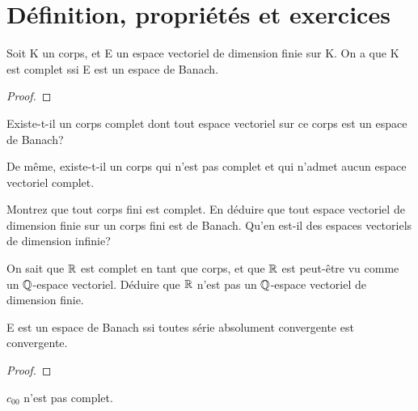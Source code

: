 \section{Définition, propriétés et exercices}


\begin{proposition}
	Soit K un corps, et E un espace vectoriel de dimension finie sur K. On a que
	K est complet ssi E est un espace de Banach.
\end{proposition}

\begin{proof}

\end{proof}

\begin{question}
	Existe-t-il un corps complet dont tout espace vectoriel sur ce corps est un
	espace de Banach?

	De même, existe-t-il un corps qui n'est pas complet et qui n'admet aucun
	espace vectoriel complet.
\end{question}

\begin{exercice}
	Montrez que tout corps fini est complet. En déduire que tout espace
	vectoriel de dimension finie sur un corps fini est de Banach. Qu'en est-il
	des espaces vectoriels de dimension infinie?
\end{exercice}

\begin{exercice}
	On sait que $\mathbb{R}$ est complet en tant que corps, et que $\mathbb{R}$ est
	peut-être vu comme un $\mathbb{Q}$-espace vectoriel. Déduire que $\mathbb{R}$
	n'est pas un $\mathbb{Q}$-espace vectoriel de dimension finie.
\end{exercice}

\begin{proposition}
	E est un espace de Banach ssi toutes série absolument convergente
	est convergente.
\end{proposition}

\begin{proof}

\end{proof}

\begin{exemple}
	$c_{00}$ n'est pas complet.
\end{exemple}

